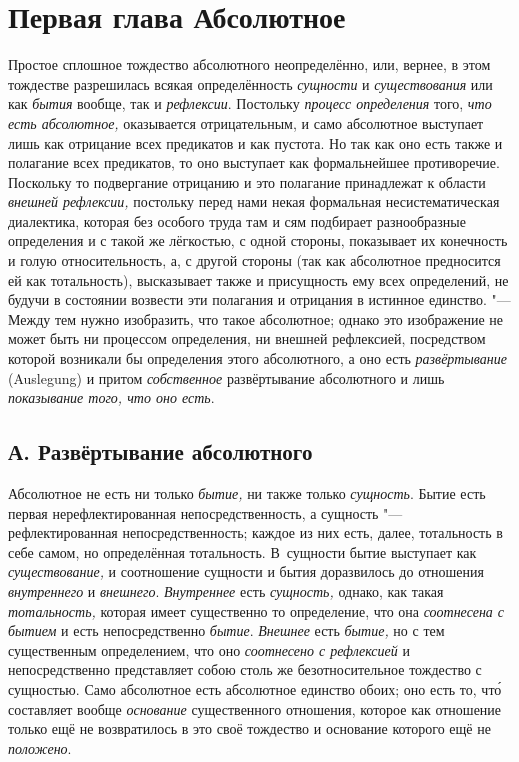 \chapter[{\em Первая глава} Абсолютное]{Первая глава Абсолютное}

Простое сплошное тождество абсолютного неопределённо, или, вернее, в этом
тождестве разрешилась всякая определённость {\em сущности} и
{\em существования} или как {\em бытия} вообще, так и {\em рефлексии}.
Постольку {\em процесс определения} того, {\em что есть абсолютное,}
оказывается отрицательным, и
само абсолютное выступает лишь как отрицание всех предикатов и как пустота.
Но так как оно есть также и полагание всех предикатов, то оно выступает как
формальнейшее противоречие. Поскольку то подвергание отрицанию и это
полагание принадлежат к области {\em внешней
рефлексии,} постольку перед нами некая формальная несистематическая
диалектика, которая без особого труда там и сям подбирает разнообразные
определения и с такой же лёгкостью, с одной стороны, показывает их
конечность и голую относительность, а, с другой стороны (так как абсолютное
предносится ей как тотальность), высказывает также и присущность ему всех
определений, не будучи в состоянии возвести эти полагания и отрицания в
истинное единство. "--- Между тем нужно изобразить, что такое абсолютное;
однако это изображение не может быть ни процессом определения, ни внешней
рефлексией, посредством которой возникали бы определения этого абсолютного,
а оно есть {\em развёртывание} (Auslegung) и притом
{\em собственное} развёртывание абсолютного и лишь
{\em показывание того, что оно есть}.

\section[А. Развёртывание абсолютного]{А. Развёртывание абсолютного}

Абсолютное не есть ни только
{\em бытие,} ни также только
{\em сущность}. Бытие есть первая нерефлектированная
непосредственность, а сущность "--- рефлектированная непосредственность;
каждое из них есть, далее, тотальность в себе самом, но определённая
тотальность. В~сущности бытие выступает как
{\em существование,} и соотношение сущности и бытия
доразвилось до отношения {\em внутреннего} и
{\em внешнего}. {\em Внутреннее}
есть {\em сущность,} однако, как такая
{\em тотальность,} которая имеет существенно то
определение, что она {\em соотнесена с бытием} и есть
непосредственно {\em бытие}.
{\em Внешнее} есть {\em бытие,} но
с тем существенным определением, что оно
{\em соотнесено с рефлексией} и непосредственно
представляет собою столь же безотносительное тождество с сущностью. Само
абсолютное есть абсолютное единство обоих; оно есть то, чт\'{о} составляет
вообще {\em основание} существенного отношения, которое
как отношение только ещё не возвратилось в это своё тождество и основание
которого ещё не {\em положено}.

